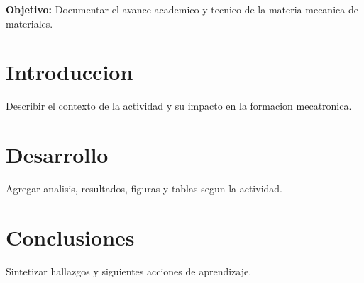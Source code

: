 \documentclass[spanish,letterpaper,oneside]{article}
\begin{document}
\templatePortrait
\templatePagecfg
\onehalfspacing

\begin{abstractd}
\textbf{Objetivo:} Documentar el avance academico y tecnico de la materia mecanica de materiales.
\end{abstractd}

\templateIndex
\templateFinalcfg

\section{Introduccion}
Describir el contexto de la actividad y su impacto en la formacion mecatronica.

\section{Desarrollo}
Agregar analisis, resultados, figuras y tablas segun la actividad.

\section{Conclusiones}
Sintetizar hallazgos y siguientes acciones de aprendizaje.



\end{document}
